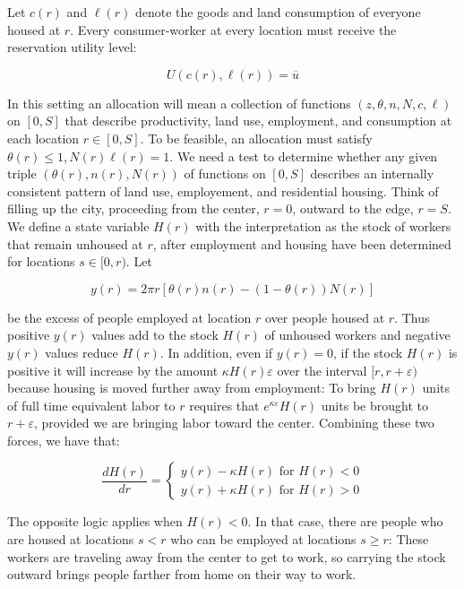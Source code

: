 Let $c(r)$ and $\ell(r)$ denote the goods and land consumption of everyone housed at $r$. Every consumer-worker at every location must receive the reservation utility level:

\begin{equation}
    U(c(r), \ell(r)) = \overline{u}
\end{equation}

In this setting an allocation will mean a collection of functions $(z, \theta, n, N, c, \ell)$ on $[0, S]$ that describe productivity, land use, employment, and consumption at each location $r \in [0, S]$. To be feasible, an allocation must satisfy $\theta(r) \leq 1, N(r)\ell(r) = 1$. We need a test to determine whether any given triple $(\theta(r), n(r), N(r))$ of functions on $[0, S]$ describes an internally consistent pattern of land use, employement, and residential housing. Think of filling up the city, proceeding from the center, $r = 0$, outward to the edge, $r = S$. We define a state variable $H(r)$ with the interpretation as the stock of workers that remain unhoused at $r$, after employment and housing have been determined for locations $s \in [0, r)$. Let

\begin{equation}
    y(r) = 2\pi r[\theta(r)n(r) - (1 - \theta(r))N(r)]
\end{equation}

be the excess of people employed at location $r$ over people housed at $r$. Thus positive $y(r)$ values add to the stock $H(r)$ of unhoused workers and negative $y(r)$ values reduce $H(r)$. In addition, even if $y(r) = 0$, if the stock $H(r)$ is positive it will increase by the amount $\kappa H(r) \varepsilon$ over the interval $[r, r + \varepsilon)$ because housing is moved further away from employment: To bring $H(r)$ units of full time equivalent labor to $r$ requires that $e^{\kappa \varepsilon} H(r)$ units be brought to $r + \varepsilon$, provided we are bringing labor toward the center. Combining these two forces, we have that:

\begin{equation}
    \frac{dH(r)}{dr} = \begin{cases}
        y(r) - \kappa H(r) \text{ for } H(r) < 0 \\
        y(r) + \kappa H(r) \text{ for } H(r) > 0
    \end{cases}
\end{equation}

The opposite logic applies when $H(r) < 0$. In that case, there are people who are housed at locations $s < r$ who can be employed at locations $s \geq r$: These workers are traveling away from the center to get to work, so carrying the stock outward brings people farther from home on their way to work.

